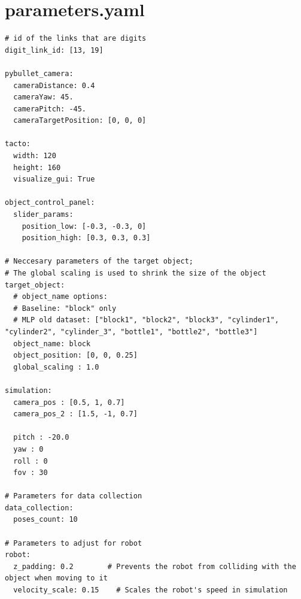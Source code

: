 \documentclass[11pt, a4paper]{report}
\begin{document}
\section{parameters.yaml}
\begin{lstlisting}
# id of the links that are digits
digit_link_id: [13, 19]

pybullet_camera:
  cameraDistance: 0.4
  cameraYaw: 45.
  cameraPitch: -45.
  cameraTargetPosition: [0, 0, 0]

tacto:
  width: 120
  height: 160
  visualize_gui: True

object_control_panel:
  slider_params:
    position_low: [-0.3, -0.3, 0]
    position_high: [0.3, 0.3, 0.3]

# Neccesary parameters of the target object;
# The global scaling is used to shrink the size of the object
target_object:
  # object_name options:
  # Baseline: "block" only
  # MLP old dataset: ["block1", "block2", "block3", "cylinder1", "cylinder2", "cylinder_3", "bottle1", "bottle2", "bottle3"]
  object_name: block
  object_position: [0, 0, 0.25]
  global_scaling : 1.0

simulation:
  camera_pos : [0.5, 1, 0.7]
  camera_pos_2 : [1.5, -1, 0.7]

  pitch : -20.0
  yaw : 0
  roll : 0
  fov : 30

# Parameters for data collection
data_collection:
  poses_count: 10

# Parameters to adjust for robot
robot:
  z_padding: 0.2        # Prevents the robot from colliding with the object when moving to it
  velocity_scale: 0.15    # Scales the robot's speed in simulation
\end{lstlisting}
\end{document}
